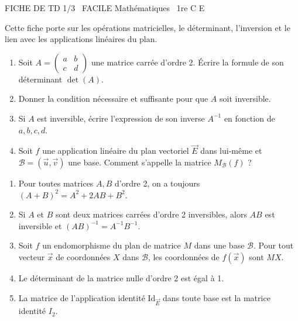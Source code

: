 \documentclass[11pt]{article}
\begin{document}
\begin{tcolorbox}[enhanced,colback=popink,colframe=popink,arc=10pt,boxrule=0pt,left=12pt,right=12pt,top=9pt,bottom=9pt]
{\color{white}\popxbold\small FICHE DE TD 1/3 \textbullet\ FACILE \hfill Mathématiques \textbullet\ 1re C E\par}
\end{tcolorbox}
\vspace{4pt}
\noindent Cette fiche porte sur les opérations matricielles, le déterminant, l'inversion et le lien avec les applications linéaires du plan.

\begin{exercice}
\begin{enumerate}
    \item Soit $A = \begin{pmatrix} a & b \\ c & d \end{pmatrix}$ une matrice carrée d'ordre 2. Écrire la formule de son déterminant $\det(A)$.
    \item Donner la condition nécessaire et suffisante pour que $A$ soit inversible.
    \item Si $A$ est inversible, écrire l'expression de son inverse $A^{-1}$ en fonction de $a,b,c,d$.
    \item Soit $f$ une application linéaire du plan vectoriel $\overrightarrow{E}$ dans lui-même et $\mathcal{B}=(\vec{u},\vec{v})$ une base. Comment s'appelle la matrice $M_{\mathcal{B}}(f)$ ?
\end{enumerate}
\end{exercice}

\begin{exercice}
\begin{enumerate}
    \item Pour toutes matrices $A,B$ d'ordre 2, on a toujours $(A+B)^2 = A^2 + 2AB + B^2$.
    \item Si $A$ et $B$ sont deux matrices carrées d'ordre 2 inversibles, alors $AB$ est inversible et $(AB)^{-1} = A^{-1}B^{-1}$.
    \item Soit $f$ un endomorphisme du plan de matrice $M$ dans une base $\mathcal{B}$. Pour tout vecteur $\vec{x}$ de coordonnées $X$ dans $\mathcal{B}$, les coordonnées de $f(\vec{x})$ sont $MX$.
    \item Le déterminant de la matrice nulle d'ordre 2 est égal à 1.
    \item La matrice de l'application identité $\text{Id}_{\overrightarrow{E}}$ dans toute base est la matrice identité $I_2$.
\end{enumerate}
\end{exercice}
\end{document}
